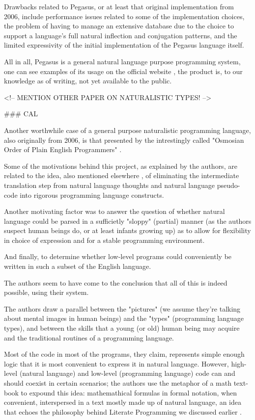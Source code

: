 Drawbacks related to Pegasus, or at least that original implementation from 2006, include performance issues related to some of the implementation choices, the problem of having to manage an extensive database due to the choice to support a language's full natural inflection and conjugation patterns, and the limited expressivity of the initial implementation of the Pegasus language itself.

All in all, Pegasus is a general natural language purpose programming system, one can see examples of its usage on the official website \cite{pegasuswebsite}, the product is, to our knowledge as of writing, not yet available to the public.

<!-- MENTION OTHER PAPER ON NATURALISTIC TYPES! -->

### CAL

Another worthwhile case of a general purpose naturalistic programming language, also originally from 2006, is that presented by the intrestingly called "Osmosian Order of Plain English Programmers" \cite{osmosianblog}.

Some of the motivations behind this project, as explained by the authors, are related to the idea, also mentioned elsewhere \cite{knoll2006pegasus}, of eliminating the intermediate translation step from natural language thoughts and natural language pseudo-code into rigorous programming language constructs.

Another motivating factor was to answer the question of whether natural language could be parsed in a sufficietly "sloppy" (partial) manner (as the authors suspect human beings do, or at least infants growing up) as to allow for flexibility in choice of expression and for a stable programming environment.

And finally, to determine whether low-level programs could conveniently be written in such a subset of the English language.

The authors seem to have come to the conclusion that all of this is indeed possible, using their system.

The authors draw a parallel between the "pictures" (we assume they're talking about mental images in human beings) and the "types" (programming language types), and between the skills that a young (or old) human being may acquire and the traditional routines of a programming language.

Most of the code in most of the programs, they claim, represents simple enough logic that it is most convenient to express it in natural language. However, high-level (natural language) and low-level (programming language) code can and should coexist in certain scenarios; the authors use the metaphor of a math text-book to expound this idea: mathemathical formulas in formal notation, when convenient, interspersed in a text mostly made up of natural language, an idea that echoes the philosophy behind Literate Programming we discussed earlier \cite{knuth1984literate}.

